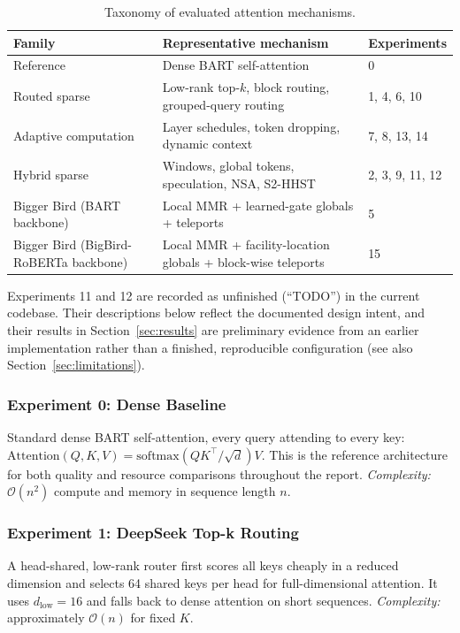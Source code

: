 \documentclass[11pt]{article}
\newcommand{\bigO}{\mathcal{O}}
\begin{document}
\begin{table}[ht]
  \centering
  \caption{Taxonomy of evaluated attention mechanisms.}
  \label{tab:taxonomy}
  \begin{tabularx}{\textwidth}{@{}l>{\raggedright\arraybackslash}Xl@{}}
    \toprule
    Family & Representative mechanism & Experiments \\
    \midrule
    Reference & Dense BART self-attention & 0 \\
    Routed sparse & Low-rank top-$k$, block routing, grouped-query routing
      & 1, 4, 6, 10 \\
    Adaptive computation & Layer schedules, token dropping, dynamic context
      & 7, 8, 13, 14 \\
    Hybrid sparse & Windows, global tokens, speculation, NSA, S2-HHST
      & 2, 3, 9, 11, 12 \\
    Bigger Bird (BART backbone) & Local MMR + learned-gate globals + teleports
      & 5 \\
    Bigger Bird (BigBird-RoBERTa backbone) & Local MMR + facility-location
      globals + block-wise teleports & 15 \\
    \bottomrule
  \end{tabularx}
\end{table}

Experiments 11 and 12 are recorded as unfinished (``TODO'') in the current
codebase. Their descriptions below reflect the documented design intent, and
their results in Section~\ref{sec:results} are preliminary evidence from an
earlier implementation rather than a finished, reproducible configuration
(see also Section~\ref{sec:limitations}).

\subsubsection*{Experiment 0: Dense Baseline}
\label{exp:baseline}
Standard dense BART self-attention, every query attending to every key:
$\mathrm{Attention}(Q,K,V) = \mathrm{softmax}(QK^\top/\sqrt{d})V$. This is the
reference architecture for both quality and resource comparisons throughout
the report. \emph{Complexity:} $\bigO(n^2)$ compute and memory in sequence
length $n$.

\subsubsection*{Experiment 1: DeepSeek Top-k Routing}
\label{exp:deepseek}
A head-shared, low-rank router first scores all keys cheaply in a reduced
dimension and selects 64 shared keys per head for full-dimensional attention.
It uses $d_{\mathrm{low}}=16$ and falls back to dense attention on short
sequences. \emph{Complexity:} approximately $\bigO(n)$ for fixed $K$.
\end{document}
